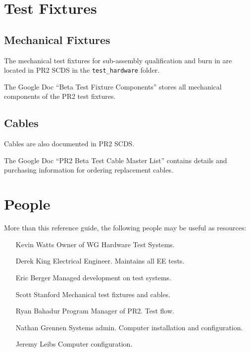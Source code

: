 \documentclass[11pt]{book}
\begin{document}
\chapter{Test Fixtures}

\section{Mechanical Fixtures}

The mechanical test fixtures for sub-assembly qualification and burn in are located in PR2 SCDS in the \texttt{test\_hardware} folder.

The Google Doc ``Beta Test Fixture Components'' stores all mechanical components of the PR2 test fixtures.

\section{Cables}

Cables are also documented in PR2 SCDS.

The Google Doc ``PR2 Beta Test Cable Master List'' contains details and purchasing information for ordering replacement cables.


\chapter {People}

More than this reference guide, the following people may be useful as resources:
\begin{itemize}
\item [Kevin Watts] Owner of WG Hardware Test Systems.
\item [Derek King] Electrical Engineer. Maintains all EE tests.
\item [Eric Berger] Managed development on test systems.
\item [Scott Stanford] Mechanical test fixtures and cables.
\item [Ryan Bahadur] Program Manager of PR2. Test flow.
\item [Nathan Grennen] Systems admin. Computer installation and configuration.
\item [Jeremy Leibs] Computer configuration.
\end{itemize}
\end{document}
